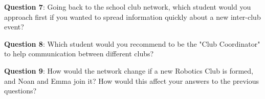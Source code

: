 \documentclass[a4paper, 14pt]{extarticle}
\begin{document}
\vspace{10em}

{\bf Question 7}: Going back to the school club network, which student would you approach first if you wanted to spread information quickly about a new inter-club event?

\vspace{3em}
{\bf Question 8}: Which student would you recommend to be the "Club Coordinator" to help communication between different clubs?

\vspace{3em}
{\bf Question 9}: How would the network change if a new Robotics Club is formed, and Noan and Emma join it? How would this affect your answers to the previous questions?
\end{document}
